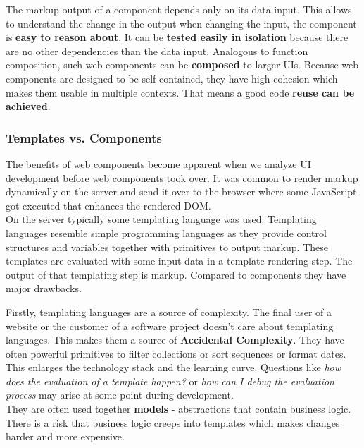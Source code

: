 The markup output of a component depends only on its data input. This allows to understand the change in the output when changing the input, the component is \textbf{easy to reason about}. It can be \textbf{tested easily in isolation} because there are no other dependencies than the data input. Analogous to function composition, such web components can be \textbf{composed} to larger UIs. Because web components are designed to be self-contained, they have high cohesion which makes them usable in multiple contexts. That means a good code \textbf{reuse can be achieved}.

\subsubsection{Templates vs. Components}

The benefits of web components become apparent when we analyze UI development before web components took over. It was common to render markup dynamically on the server and send it over to the browser where some JavaScript got executed that enhances the rendered DOM. \\
On the server typically some templating language was used. Templating languages resemble simple programming languages as they provide control structures and variables together with primitives to output markup. These templates are evaluated with some input data in a template rendering step. The output of that templating step is markup. Compared to components they have major drawbacks.

Firstly, templating languages are a source of complexity. The final user of a website or the customer of a software project doesn't care about templating languages. This makes them a source of \textbf{Accidental Complexity}. They have often powerful primitives to filter collections or sort sequences or format dates. This enlarges the technology stack and the learning curve. Questions like \textit{how does the evaluation of a template happen?} or \textit{how can I debug the evaluation process} may arise at some point during development. \\
They are often used together \textbf{models} - abstractions that contain business logic. There is a risk that business logic creeps into templates which makes changes harder and more expensive.

